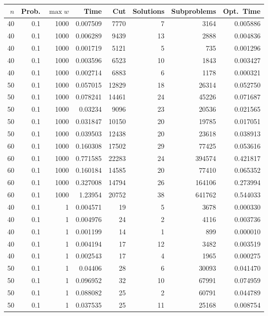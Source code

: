 \documentclass[a4paper,11pt]{article}
\begin{document}
\begin{table}
\begin{center}
\begin{tabular}{|rrr|r|r|rr|r|}
\hline
$n$ & Prob. & $\max w$ & Time & Cut & Solutions & Subproblems & Opt.\ Time \\
\hline
40 & 0.1 & 1000 & 0.007509 & 7770 & 7 & 3164 & 0.005886 \\
40 & 0.1 & 1000 & 0.006289 & 9439 & 13 & 2888 & 0.004836 \\
40 & 0.1 & 1000 & 0.001719 & 5121 & 5 & 735 & 0.001296 \\
40 & 0.1 & 1000 & 0.003596 & 6523 & 10 & 1843 & 0.003427 \\
40 & 0.1 & 1000 & 0.002714 & 6883 & 6 & 1178 & 0.000321 \\
50 & 0.1 & 1000 & 0.057015 & 12829 & 18 & 26314 & 0.052750 \\
50 & 0.1 & 1000 & 0.078241 & 14461 & 24 & 45226 & 0.071687 \\
50 & 0.1 & 1000 & 0.03234 & 9096 & 23 & 20536 & 0.021565 \\
50 & 0.1 & 1000 & 0.031847 & 10150 & 20 & 19785 & 0.017051 \\
50 & 0.1 & 1000 & 0.039503 & 12438 & 20 & 23618 & 0.038913 \\
60 & 0.1 & 1000 & 0.160308 & 17502 & 29 & 77425 & 0.053616 \\
60 & 0.1 & 1000 & 0.771585 & 22283 & 24 & 394574 & 0.421817 \\
60 & 0.1 & 1000 & 0.160184 & 14585 & 20 & 77410 & 0.065352 \\
60 & 0.1 & 1000 & 0.327008 & 14794 & 26 & 164106 & 0.273994 \\
60 & 0.1 & 1000 & 1.23954 & 20752 & 38 & 641762 & 0.544033 \\
\hline
40 & 0.1 & 1 & 0.004571 & 19 & 5 & 3678 & 0.000330 \\
40 & 0.1 & 1 & 0.004976 & 24 & 2 & 4116 & 0.003736 \\
40 & 0.1 & 1 & 0.001199 & 14 & 1 & 899 & 0.000010 \\
40 & 0.1 & 1 & 0.004194 & 17 & 12 & 3482 & 0.003519 \\
40 & 0.1 & 1 & 0.002543 & 17 & 4 & 1965 & 0.000275 \\
50 & 0.1 & 1 & 0.04406 & 28 & 6 & 30093 & 0.041470 \\
50 & 0.1 & 1 & 0.096952 & 32 & 10 & 67991 & 0.074959 \\
50 & 0.1 & 1 & 0.088082 & 25 & 2 & 60791 & 0.044789 \\
50 & 0.1 & 1 & 0.037535 & 25 & 11 & 25168 & 0.008754 \\

\end{tabular}
\end{center}
\end{table}
\end{document}
